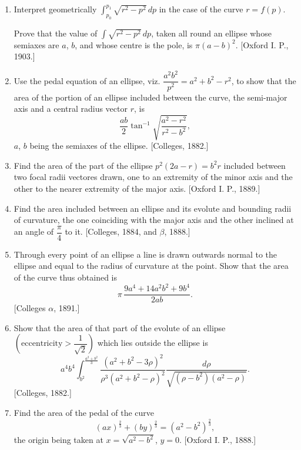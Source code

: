 \documentclass[11pt, a4paper]{article}
\newcommand{\source}[1]{\hfill\textnormal{[#1]}}
\begin{document}
\begin{enumerate}[leftmargin=2em]

\item Interpret geometrically $\displaystyle\int_{p_0}^{p_1}\sqrt{r^2-p^2}\,dp$ in the case of the curve $r=f(p)$.

Prove that the value of $\displaystyle\int\sqrt{r^2-p^2}\,dp$, taken all round an ellipse whose semiaxes are $a$, $b$, and whose centre is the pole, is $\pi(a-b)^2$. \source{Oxford I. P., 1903.}

\item Use the pedal equation of an ellipse, viz. $\dfrac{a^2b^2}{p^2}=a^2+b^2-r^2$, to show that the area of the portion of an ellipse included between the curve, the semi-major axis and a central radius vector $r$, is
\[
\frac{ab}{2}\tan^{-1}\sqrt{\frac{a^2-r^2}{r^2-b^2}},
\]
$a$, $b$ being the semiaxes of the ellipse. \source{Colleges, 1882.}

\item Find the area of the part of the ellipse $p^2(2a-r)=b^2r$ included between two focal radii vectores drawn, one to an extremity of the minor axis and the other to the nearer extremity of the major axis. \source{Oxford I. P., 1889.}

\item Find the area included between an ellipse and its evolute and bounding radii of curvature, the one coinciding with the major axis and the other inclined at an angle of $\dfrac{\pi}{4}$ to it. \source{Colleges, 1884, and $\beta$, 1888.}

\item Through every point of an ellipse a line is drawn outwards normal to the ellipse and equal to the radius of curvature at the point. Show that the area of the curve thus obtained is
\[
\pi\,\frac{9a^4+14a^2b^2+9b^4}{2ab}.
\]
\source{Colleges $\alpha$, 1891.}

\item Show that the area of that part of the evolute of an ellipse $\left(\text{eccentricity}>\dfrac{1}{\sqrt2}\right)$ which lies outside the ellipse is
\[
a^4b^4\int_{b^2}^{\frac{a^2+b^2}{3}}\frac{(a^2+b^2-3\rho)^2}{\rho^3(a^2+b^2-\rho)^2}\frac{d\rho}{\sqrt{(\rho-b^2)(a^2-\rho)}}.
\]
\source{Colleges, 1882.}

\item Find the area of the pedal of the curve
\[
(ax)^{\frac23}+(by)^{\frac23}=(a^2-b^2)^{\frac23},
\]
the origin being taken at $x=\sqrt{a^2-b^2}$, $y=0$. \source{Oxford I. P., 1888.}


\end{enumerate}
\end{document}
